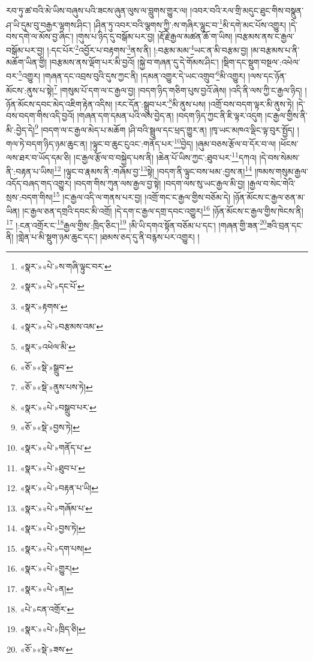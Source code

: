 རབ་ཏུ་ཚ་བའི་མེ་ཡིས་བཞུས་པའི་ཟངས་ཞུན་ལུས་ལ་བླུགས་གྱུར་ལ། །འབར་བའི་རལ་གྲི་མདུང་ཐུང་གིས་བསྣུན་ཤ་ཡི་དུམ་བུ་བརྒྱར་ལྷགས་ཤིང་། །ཤིན་ཏུ་འབར་བའི་ལྕགས་ཀྱི་:ས་གཞིར་ལྷུང་བ་\footnote{«སྣར་»«པེ་»ས་གཞི་ལྟུང་བར་}མི་དགེ་མང་པོས་འགྱུར། །དེ་བས་དགེ་ལ་མོས་བྱ་ཞིང་། །གུས་པ་ཉིད་དུ་བསྒོམ་པར་བྱ། །རྡོ་རྗེ་རྒྱལ་མཚན་ཆོ་ག་ཡིས། །བརྩམས་ནས་ང་རྒྱལ་བསྒོམ་པར་བྱ། །:དང་པོར་\footnote{«སྣར་»«པེ་»དང་པོ་}འབྱོར་པ་བརྟགས་\footnote{«སྣར་»རྟགས་}ནས་ནི། །:བརྩམ་མམ་\footnote{«སྣར་»«པེ་»བརྩམས་འམ་}ཡང་ན་མི་བརྩམ་བྱ། །མ་བརྩམས་པ་ནི་མཆོག་ཡིན་གྱི། །བརྩམས་ནས་ལྡོག་པར་མི་བྱའོ། །སྐྱེ་བ་གཞན་དུ་དེ་གོམས་ཤིང་། །སྡིག་དང་སྡུག་བསྔལ་:འཕེལ་བར་\footnote{«སྣར་»འཕེལ་མི་}འགྱུར། །གཞན་དང་འབྲས་བུའི་དུས་ཀྱང་ནི། །དམན་འགྱུར་དེ་ཡང་འགྲུབ་\footnote{«ཅོ་»«སྡེ་»སྒྲུབ་}མི་འགྱུར། །ལས་དང་ཉོན་མོངས་:ནུས་པ་སྟེ།\footnote{«ཅོ་»«སྡེ་»ནུས་པས་ཏེ།} །གསུམ་པོ་དག་ལ་ང་རྒྱལ་བྱ། །བདག་ཉིད་གཅིག་པུས་བྱའོ་ཞེས། །འདི་ནི་ལས་ཀྱི་ང་རྒྱལ་ཉིད། །ཉོན་མོངས་དབང་མེད་འཇིག་རྟེན་འདིས། །རང་དོན་:སྒྲུབ་པར་\footnote{«སྣར་»«པེ་»བསྒྲུབ་པར་}མི་ནུས་པས། །འགྲོ་བས་བདག་ལྟར་མི་ནུས་ཏེ། །དེ་བས་བདག་གིས་འདི་བྱའོ། །གཞན་དག་དམན་པའི་ལས་བྱེད་ན། །བདག་ཉིད་ཀྱང་ནི་ཇི་ལྟར་འདུག །ང་རྒྱལ་གྱིས་ནི་མི་:བྱེད་དེ།\footnote{«ཅོ་»«སྡེ་»བྱས་ཏེ།} །བདག་ལ་ང་རྒྱལ་མེད་པ་མཆོག །ཤི་བའི་སྦྲུལ་དང་ཕྲད་གྱུར་ན། །ཁྭ་ཡང་མཁའ་ལྡིང་ལྟ་བུར་སྤྱོད། །གལ་ཏེ་བདག་ཉིད་ཉམ་ཆུང་ན། །ལྟུང་བ་ཆུང་ངུའང་:གནོད་པར་\footnote{«སྣར་»«པེ་»གནོད་པ་}བྱེད། །ཞུམ་བཅས་རྩོལ་བ་དོར་བ་ལ། །ཕོངས་ལས་ཐར་བ་ཡོད་དམ་ཅི། །ང་རྒྱལ་རྩོལ་བ་བསྐྱེད་པས་ནི། །ཆེན་པོ་ཡིས་ཀྱང་:ཐུབ་པར་\footnote{«སྣར་»«པེ་»ཐུབ་པ་}དཀའ། །དེ་བས་སེམས་ནི་:བརྟན་པ་ཡིས།\footnote{«སྣར་»«པེ་»བརྟན་པ་ཡི།} །ལྟུང་བ་རྣམས་ནི་:གཞོམ་བྱ་\footnote{«སྣར་»«པེ་»གཞོམ་པ་}སྟེ། །བདག་ནི་ལྟུང་བས་ཕམ་:བྱས་ན།\footnote{«སྣར་»«པེ་»བྱས་ཏེ།} །ཁམས་གསུམ་རྒྱལ་འདོད་བཞད་གད་འགྱུར། །བདག་གིས་ཀུན་ལས་རྒྱལ་བྱ་སྟེ། །བདག་ལས་སུ་ཡང་རྒྱལ་མི་བྱ། །རྒྱལ་བ་སེང་གེའི་སྲས་:བདག་གིས།\footnote{«སྣར་»«པེ་»དག་པས།} །ང་རྒྱལ་འདི་ལ་གནས་པར་བྱ། །འགྲོ་གང་ང་རྒྱལ་གྱིས་བཅོམ་དེ། །ཉོན་མོངས་ང་རྒྱལ་ཅན་མ་ཡིན། །ང་རྒྱལ་ཅན་དགྲའི་དབང་མི་འགྲོ། །དེ་དག་ང་རྒྱལ་དགྲ་དབང་འགྱུར།\footnote{«སྣར་»«པེ་»གྱུར།} །ཉོན་མོངས་ང་རྒྱལ་གྱིས་ཁེངས་ནི།\footnote{«སྣར་»«པེ་»ན།} །:ངན་འགྲོར་ང་\footnote{«པེ་»ངན་འགྲོར་}རྒྱལ་གྱིས་:ཁྲིད་ཅིང་།\footnote{«སྣར་»«པེ་»ཁྲིད་ཅི།} །མི་ཡི་དགའ་སྟོན་བཅོམ་པ་དང་། །གཞན་གྱི་ཟན་\footnote{«ཅོ་»«སྡེ་»ཟས་}ཟའི་བྲན་དང་ནི། །གླེན་པ་མི་སྡུག་ཉམ་ཆུང་དང་། །ཐམས་ཅད་དུ་ནི་བརྙས་པར་འགྱུར། །
